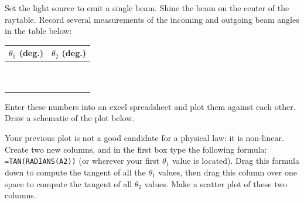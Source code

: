 \documentclass{handout}
\begin{document}
\begin{questions}
    \question Set the light source to emit a single beam. Shine the beam on the center of the raytable. Record several measurements of the incoming and outgoing beam angles in the table below:
    \begin{table}[h!]
        \centering
        \begin{tabular}{c|c}
             $\theta_1$ (deg.) & $\theta_2$ (deg.) \\\hline
             & \\
             & \\
             & \\
             & \\
             & \\
             & \\
             & \\
             & \\
             & \\
             & \\
        \end{tabular}
    \end{table}
    \clearpage

    \question Enter these numbers into an excel spreadsheet and plot them against each other. Draw a schematic of the plot below.

    \answerspace{2in}

\end{questions}
Your previous plot is not a good candidate for a physical law: it is non-linear. Create two new columns, and in the first box type the following formula: \texttt{=TAN(RADIANS(A2))} (or wherever your first $\theta_1$ value is located). Drag this formula down to compute the tangent of all the $\theta_1$ values, then drag this column over one space to compute the tangent of all $\theta_2$ values. Make a scatter plot of these two columns.
\end{document}
